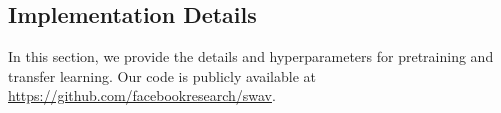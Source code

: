 \renewcommand{\thesubsection}{\Alph{subsection}}
\newcommand\tab[1][5mm]{\hspace*{#1}}

\subsection{Implementation Details}
\label{ap:implementation}
In this section, we provide the details and hyperparameters for \OURS pretraining and transfer learning.
Our code is publicly available at \url{https://github.com/facebookresearch/swav}.

